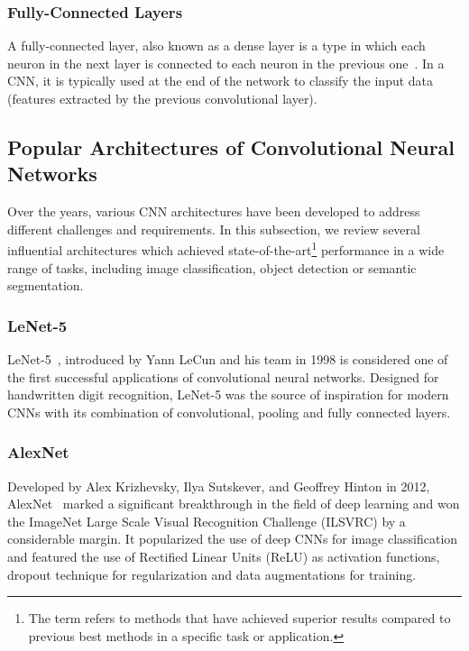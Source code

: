\subsubsection{Fully-Connected Layers}

A fully-connected layer, also known as a dense layer is a type in which each
neuron in the next layer is connected to each neuron in the previous
one~\cite{OShea2015}. In a CNN, it is typically used at the end of the network
to classify the input data (features extracted by the previous convolutional
layer).



\subsection{Popular Architectures of Convolutional Neural Networks}


Over the years, various CNN architectures have been developed to address
different challenges and requirements. In this subsection, we review several
influential architectures which achieved state-of-the-art\footnote{The term
 refers to methods that have achieved superior results
compared to previous best methods in a specific task or application.}
performance in a wide range of tasks, including image classification, object
detection or semantic segmentation.


\subsubsection{LeNet-5}

LeNet-5~\cite{Lecun1998}, introduced by Yann LeCun and his team in 1998 is
considered one of the first successful applications of convolutional neural
networks. Designed for handwritten digit recognition, LeNet-5 was the source of
inspiration for modern CNNs with its combination of convolutional, pooling and
fully connected layers.


\subsubsection{AlexNet}

Developed by Alex Krizhevsky, Ilya Sutskever, and Geoffrey Hinton in 2012,
AlexNet~\cite{NIPS2012} marked a significant breakthrough in the field of deep
learning and won the ImageNet Large Scale Visual Recognition Challenge (ILSVRC)
by a considerable margin. It popularized the use of deep CNNs for image
classification and featured the use of Rectified Linear Units (ReLU) as
activation functions, dropout technique for regularization and data
augmentations for training.



